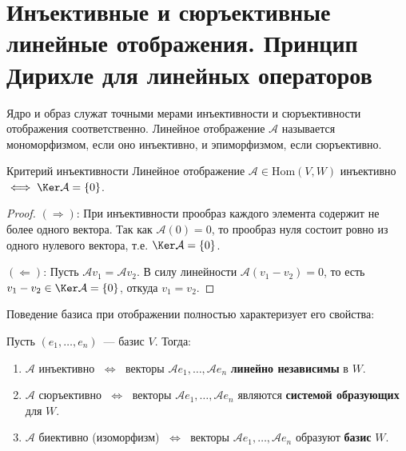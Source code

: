 
\section{Инъективные и сюръективные линейные отображения. Принцип Дирихле для линейных операторов}

Ядро и образ служат точными мерами инъективности и сюръективности отображения соответственно.
Линейное отображение $\mathcal{A}$ называется мономорфизмом, если оно инъективно, и эпиморфизмом, если сюръективно.

\begin{Proposition}{Критерий инъективности}{}
	Линейное отображение $\mathcal{A} \in \mathrm{Hom}(V, W)$ инъективно $\;\Longleftrightarrow\; \Ker\mathcal{A} = \{0\}$.
\end{Proposition}
\begin{proof}
	$(\Rightarrow)$: При инъективности прообраз каждого элемента содержит не более одного вектора. Так как $\mathcal{A}(0) = 0$, то прообраз нуля состоит ровно из одного нулевого вектора, т.е. $\Ker\mathcal{A} = \{0\}$.
	
	$(\Leftarrow)$: Пусть $\mathcal{A}v_1 = \mathcal{A}v_2$. В силу линейности $\mathcal{A}(v_1 - v_2) = 0$, то есть $v_1 - v_2 \in \Ker\mathcal{A} = \{0\}$, откуда $v_1 = v_2$.
\end{proof}

Поведение базиса при отображении полностью характеризует его свойства:
\begin{Proposition}{}{}
	Пусть $(e_1, \ldots, e_n)$~--- базис $V$. Тогда:
	\begin{enumerate}
		\item $\mathcal{A}$ инъективно $\;\Leftrightarrow\;$ векторы $\mathcal{A}e_1, \ldots, \mathcal{A}e_n$ \textbf{линейно независимы} в $W$.
		\item $\mathcal{A}$ сюръективно $\;\Leftrightarrow\;$ векторы $\mathcal{A}e_1, \ldots, \mathcal{A}e_n$ являются \textbf{системой образующих} для $W$.
		\item $\mathcal{A}$ биективно (изоморфизм) $\;\Leftrightarrow\;$ векторы $\mathcal{A}e_1, \ldots, \mathcal{A}e_n$ образуют \textbf{базис} $W$.
	\end{enumerate}
\end{Proposition}

